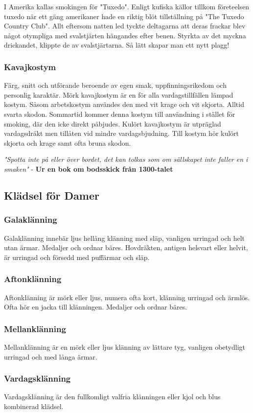 I Amerika kallas smokingen för "Tuxedo". Enligt kufiska källor tillkom företeelsen tuxedo när ett gäng amerikaner hade en riktig blöt tillställning på "The Tuxedo Country Club". Allt eftersom natten led tyckte deltagarna att deras frackar blev något otympliga med svalstjärten hängandes efter benen. Styrkta av det myckna drickandet, klippte de av svalstjärtarna. Så lätt skapar man ett nytt plagg!

\subsubsection*{\textbf{Kavajkostym}}

Färg, snitt och utförande beroende av egen smak, uppfinningsrikedom och personlig karaktär. Mörk kavajkostym är en för alla vardagstillfällen lämpad kostym. Såsom arbetskostym användes den med vit krage och vit skjorta. Alltid svarta skodon. Sommartid kommer denna kostym till användning i stället för smoking, där den icke direkt påbjudes. Kulört kavajkostym är utpräglad vardagsdräkt men tillåten vid mindre vardagsbjudning. Till kostym hör kulört skjorta och krage samt ofta bruna skodon.

\textit{"Spotta inte på eller över bordet, det kan tolkas som om sällskapet inte faller en i smaken"} - \textbf{Ur en bok om bodsskick från 1300-talet}

\subsection*{\textbf{Klädsel för Damer}}
\subsubsection*{\textbf{Galaklänning}}
Galaklänning innebär ljus hellång klänning med släp, vanligen urringad och helt utan ärmar. Medaljer och ordnar bäres. Hovdräkten, antigen helsvart eller helvit, är urringad och försedd med puffärmar och släp.

\subsubsection*{\textbf{Aftonklänning}}
Aftonklänning är mörk eller ljus, numera ofta kort, klänning urringad och ärmlös. Ofta hör en jacka till klänningen. Medaljer och ordnar bäres.

\subsubsection*{\textbf{Mellanklänning}}
Mellanklänning är en mörk eller ljus klänning av lättare tyg, vanligen obetydligt urringad och med långa ärmar.

\subsubsection*{\textbf{Vardagsklänning}}
Vardagsklänning är den fullkomligt valfria klänningen eller kjol och blus kombinerad klädsel.





\newpage